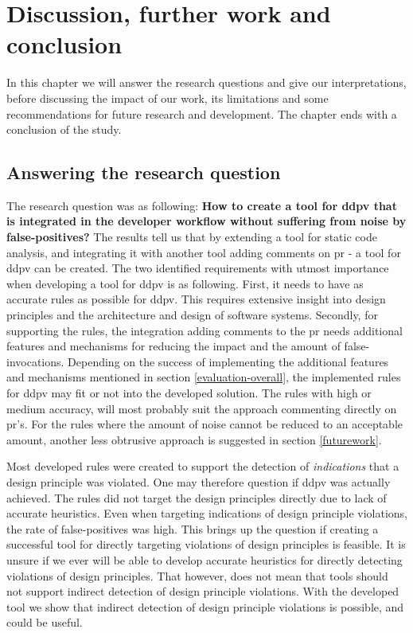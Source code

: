 \documentclass[pdftex,10pt,b5paper,twoside]{report}
\begin{document}
\cleardoublepage
\chapter{Discussion, further work and conclusion}
\label{discussion}
In this chapter we will answer the research questions and give our interpretations, before discussing the impact of our work, its limitations and some recommendations for future research and development. The chapter ends with a conclusion of the study.

\section{Answering the research question}

The research question was as following: \textbf{How to create a tool for \gls{ddpv} that is integrated in the developer workflow without suffering from noise by false-positives?}
The results tell us that by extending a tool for static code analysis, and integrating it with another tool adding comments on \gls{pr} - a tool for \gls{ddpv} can be created. The two identified requirements with utmost importance when developing a tool for \gls{ddpv} is as following. First, it needs to have as accurate rules as possible for \gls{ddpv}. This requires extensive insight into design principles and the architecture and design of software systems. Secondly, for supporting the rules, the integration adding comments to the \gls{pr} needs additional features and mechanisms for reducing the impact and the amount of false-invocations. Depending on the success of implementing the additional features and mechanisms mentioned in section \ref{evaluation-overall}, the implemented rules for \gls{ddpv} may fit or not into the developed solution. The rules with high or medium accuracy, will most probably suit the approach commenting directly on \gls{pr}'s. For the rules where the amount of noise cannot be reduced to an acceptable amount, another less obtrusive approach is suggested in section \ref{futurework}.

Most developed rules were created to support the detection of \textit{indications} that a design principle was violated. One may therefore question if \gls{ddpv} was actually achieved. The rules did not target the design principles directly due to lack of accurate heuristics. Even when targeting indications of design principle violations, the rate of false-positives was high. This brings up the question if creating a successful tool for directly targeting violations of design principles is feasible. It is unsure if we ever will be able to develop accurate heuristics for directly detecting violations of design principles. That however, does not mean that tools should not support indirect detection of design principle violations. With the developed tool we show that indirect detection of design principle violations is possible, and could be useful. 
\end{document}
